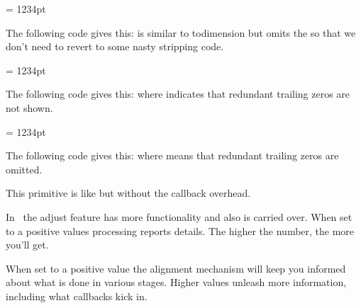 \stopoldprimitive

\startnewprimitive[title={\prm {toscaled}}]

\startbuffer
\scratchdimen = 1234pt \toscaled\scratchdimen
\stopbuffer

The following code gives this: {\nospacing\inlinebuffer} is similar to \prm
{todimension} but omits the  so that we don't need to revert to some
nasty stripping code.

\typebuffer

\stopnewprimitive

\startnewprimitive[title={\prm {tosparsedimension}}]

\startbuffer
\scratchdimen = 1234pt \tosparsedimension\scratchdimen
\stopbuffer

The following code gives this: {\nospacing\inlinebuffer} where 
indicates that redundant trailing zeros are not shown.

\typebuffer

\stopnewprimitive

\startnewprimitive[title={\prm {tosparsescaled}}]

\startbuffer
\scratchdimen = 1234pt \tosparsescaled\scratchdimen
\stopbuffer

The following code gives this: {\nospacing\inlinebuffer} where 
means that redundant trailing zeros are omitted.

\typebuffer

\stopnewprimitive

\startnewprimitive[title={\prm {tpack}}]

This primitive is like  but without the callback overhead.

\stopnewprimitive

\startnewprimitive[title={\prm {tracingadjusts}}]

In \LUAMETATEX\ the adjust feature has more functionality and also is carried
over. When set to a positive values  processing reports details.
The higher the number, the more you'll get.

\stopnewprimitive

\startnewprimitive[title={\prm {tracingalignments}}]

When set to a positive value the alignment mechanism will keep you informed about
what is done in various stages. Higher values unleash more information, including
what callbacks kick in.

\stopnewprimitive

